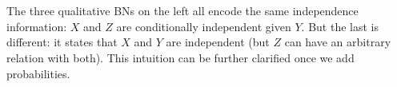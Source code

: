 \begin{center}
    \def\XYZnodes{%
        \node[bnnode] (X) at (0,-1) {$X$};
        \node[bnnode] (Y) at (0,0) {$Y$};
        \node[bnnode] (Z) at (0,1) {$Z$};
    }
    ~~~
    ~~~
    \hspace{2cm}
\end{center}

The three qualitative BNs on the left all encode the same independence information:
$X$ and $Z$ are conditionally independent given $Y$.
But the last is different: it states that $X$ and $Y$ are independent (but $Z$ can have an arbitrary relation with both).
This intuition can be further clarified once we add probabilities.

